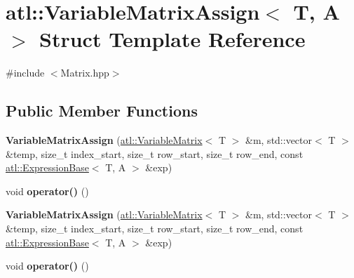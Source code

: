 \hypertarget{structatl_1_1_variable_matrix_assign}{\section{atl\+:\+:Variable\+Matrix\+Assign$<$ T, A $>$ Struct Template Reference}
\label{structatl_1_1_variable_matrix_assign}
}


{\ttfamily \#include $<$Matrix.\+hpp$>$}

\subsection*{Public Member Functions}
\begin{DoxyCompactItemize}
\item 
\hypertarget{structatl_1_1_variable_matrix_assign_a61af4c7cf5a2597116469d2e6c1281d0}{{\bfseries Variable\+Matrix\+Assign} (\hyperlink{structatl_1_1_variable_matrix}{atl\+::\+Variable\+Matrix}$<$ T $>$ \&m, std\+::vector$<$ T $>$ \&temp, size\+\_\+t index\+\_\+start, size\+\_\+t row\+\_\+start, size\+\_\+t row\+\_\+end, const \hyperlink{structatl_1_1_expression_base}{atl\+::\+Expression\+Base}$<$ T, A $>$ \&exp)}\label{structatl_1_1_variable_matrix_assign_a61af4c7cf5a2597116469d2e6c1281d0}

\item 
\hypertarget{structatl_1_1_variable_matrix_assign_a30b25b68b51d285bf7f7f373a0cbfdc2}{void {\bfseries operator()} ()}\label{structatl_1_1_variable_matrix_assign_a30b25b68b51d285bf7f7f373a0cbfdc2}

\item 
\hypertarget{structatl_1_1_variable_matrix_assign_a61af4c7cf5a2597116469d2e6c1281d0}{{\bfseries Variable\+Matrix\+Assign} (\hyperlink{structatl_1_1_variable_matrix}{atl\+::\+Variable\+Matrix}$<$ T $>$ \&m, std\+::vector$<$ T $>$ \&temp, size\+\_\+t index\+\_\+start, size\+\_\+t row\+\_\+start, size\+\_\+t row\+\_\+end, const \hyperlink{structatl_1_1_expression_base}{atl\+::\+Expression\+Base}$<$ T, A $>$ \&exp)}\label{structatl_1_1_variable_matrix_assign_a61af4c7cf5a2597116469d2e6c1281d0}

\item 
\hypertarget{structatl_1_1_variable_matrix_assign_a30b25b68b51d285bf7f7f373a0cbfdc2}{void {\bfseries operator()} ()}\label{structatl_1_1_variable_matrix_assign_a30b25b68b51d285bf7f7f373a0cbfdc2}

\end{DoxyCompactItemize}
